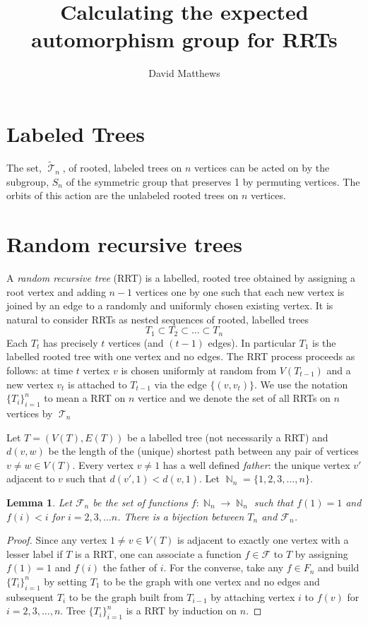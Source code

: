 \documentclass[10pt]{amsart} %
\title{Calculating the expected automorphism group for RRTs}
\author{David Matthews}
\newtheorem{lem}[thm]{Lemma}
\theoremstyle{definition}
\DeclareMathOperator{\T}{\mathcal{T}}
\DeclareMathOperator{\N}{\mathbb{N}}
\begin{document}
\maketitle

\section{Labeled Trees}

The set, $\tilde{\T}_n$, of rooted, labeled trees on $n$ vertices can be acted on by the subgroup, $S_n$ of the symmetric group that preserves 1 by permuting vertices.  The orbits of this action are the unlabeled rooted trees on $n$ vertices.     

\section{Random recursive trees}


A \emph{random recursive tree} (RRT) is a labelled, rooted tree obtained by assigning a root vertex and adding $n-1$ vertices one by one such that each new vertex is joined by an edge to a randomly and uniformly chosen existing vertex. It is natural to consider RRTs as nested sequences of rooted, labelled trees
\[T_{1} \subset T_{2} \subset \dots \subset T_{n}\]
Each $T_{t}$ has precisely $t$ vertices (and $(t-1)$ edges).  In particular $T_1$ is the labelled rooted tree with one vertex and no edges.  The RRT process proceeds as follows: at time $t$ vertex $v$ is chosen uniformly at random from $V(T_{t-1})$ and a new vertex $v_{t}$ is attached to $T_{t-1}$ via the edge $\{(v,v_{t})\}$. We use the notation $\{T_i\}_{i=1}^{n}$ to mean a RRT on $n$ vertice and we denote the set of all RRTs on $n$ vertices by $\T_n$

Let $T = (V(T),E(T))$ be a labelled tree (not necessarily a RRT) and $d(v,w)$ be the length of the (unique) shortest path between any pair of vertices $v\neq w \in V(T)$.  Every vertex $v \neq 1 $ has a well defined \emph{father}: the unique vertex $v'$ adjacent to $v$ such that $d(v',1)< d(v,1)$.   Let $\N_n = \{1,2,3,\dots,n\}$. 

\begin{lem}
 Let $\mathcal{F}_n$ be the set of functions $f: \N_n \longrightarrow \N_n$ such that $f(1) = 1$ and $f(i) <i$ for $i = 2,3,\dots n$.  There is a bijection between $T_n$ and $\mathcal{F}_n$.
\end{lem}

\begin{proof}  Since any vertex $1 \neq v \in V(T)$ is adjacent to exactly one vertex with a lesser label if $T$ is a RRT, 
one can associate a function $f \in \mathcal{F}$ to $T$ by assigning  $f(1) =1$ and $f(i)$ the father of $i$. 
For the converse, take any $f \in {F}_n$ and build $\{T_{i}\}_{i=1}^{n}$ by setting $T_1$ to be the graph with one vertex and no edges and subsequent $T_i$ to be the graph built from $T_{i-1}$ by attaching vertex $i$ to $f(v)$ for $i = 2,3,\dots,n$.  Tree $\{T_{i}\}_{i=1}^{n}$ is a RRT by induction on $n$.   
\end{proof}
\end{document}
